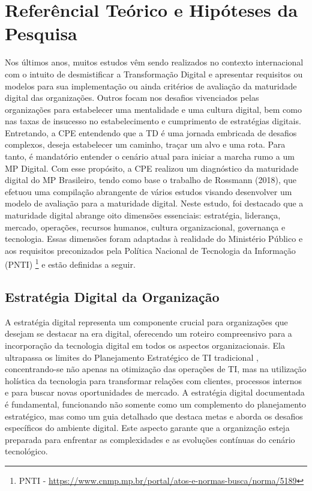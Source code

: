 \section{Referêncial Teórico e Hipóteses da Pesquisa}

Nos últimos anos, muitos estudos vêm sendo realizados no contexto internacional com o intuito de desmistificar a Transformação Digital e apresentar requisitos ou modelos para sua implementação ou ainda critérios de avaliação da maturidade digital das organizações. Outros focam nos desafios vivenciados pelas organizações para estabelecer uma mentalidade e uma cultura digital, bem como nas taxas de insucesso no estabelecimento e cumprimento de estratégias digitais. Entretando, a CPE entendendo que a TD é uma jornada embricada de desafios complexos, deseja estabelecer um caminho, traçar um alvo e uma rota. Para tanto, é mandatório entender o cenário atual para iniciar a marcha rumo a um MP Digital. Com esse propósito, a CPE realizou um diagnóstico da maturidade digital do MP Brasileiro, tendo como base o trabalho de Rossmann (2018), que efetuou uma compilação abrangente de vários estudos visando desenvolver um modelo de avaliação para a maturidade digital. Neste estudo, foi destacado que a maturidade digital abrange oito dimensões essenciais: estratégia, liderança, mercado, operações, recursos humanos, cultura organizacional, governança e tecnologia. Essas dimensões foram adaptadas à realidade do Ministério Público e aos requisitos preconizados pela Política Nacional de Tecnologia da Informação (PNTI) \footnote{PNTI - \url{https://www.cnmp.mp.br/portal/atos-e-normas-busca/norma/5189}} e estão definidas a seguir.

\subsection{Estratégia Digital da Organização }

A estratégia digital representa um componente crucial para organizações que desejam se destacar na era digital, oferecendo um roteiro compreensivo para a incorporação da tecnologia digital em todos os aspectos organizacionais. Ela ultrapassa os limites do Planejamento Estratégico de TI tradicional \cite{dolganova2019company}, concentrando-se não apenas na otimização das operações de TI, mas na utilização holística da tecnologia para transformar relações com clientes, processos internos e para buscar novas oportunidades de mercado. A estratégia digital documentada é fundamental, funcionando não somente como um complemento do planejamento estratégico, mas como um guia detalhado que destaca metas e aborda os desafios específicos do ambiente digital. Este aspecto garante que a organização esteja preparada para enfrentar as complexidades e as evoluções contínuas do cenário tecnológico.

